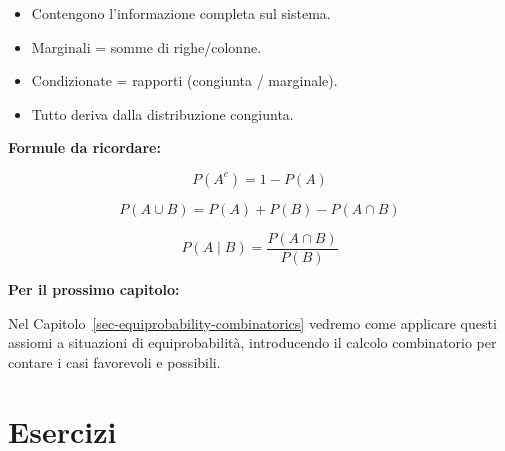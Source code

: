 \documentclass[
  italian,
  letterpaper,
  a4paper,
  11pt,
  open=any]{scrbook}
\providecommand{\tightlist}{%
  \setlength{\itemsep}{0pt}\setlength{\parskip}{0pt}}
\theoremstyle{plain}
\theoremstyle{definition}
\theoremstyle{definition}
\theoremstyle{remark}
\begin{document}
\begin{tcolorbox}
\begin{enumerate}
  \begin{itemize}
  \tightlist
  \item
    Contengono l'informazione completa sul sistema.
  \item
    Marginali = somme di righe/colonne.
  \item
    Condizionate = rapporti (congiunta / marginale).
  \item
    Tutto deriva dalla distribuzione congiunta.
  \end{itemize}
\end{enumerate}

\textbf{Formule da ricordare:}

\[P(A^c) = 1 - P(A)\]

\[P(A \cup B) = P(A) + P(B) - P(A \cap B)\]

\[P(A \mid B) = \frac{P(A \cap B)}{P(B)}\]

\textbf{Per il prossimo capitolo:}

Nel Capitolo~\ref{sec-equiprobability-combinatorics} vedremo come
applicare questi assiomi a situazioni di equiprobabilità, introducendo
il calcolo combinatorio per contare i casi favorevoli e possibili.

\end{tcolorbox}

\section*{Esercizi}\label{esercizi}

\end{document}
